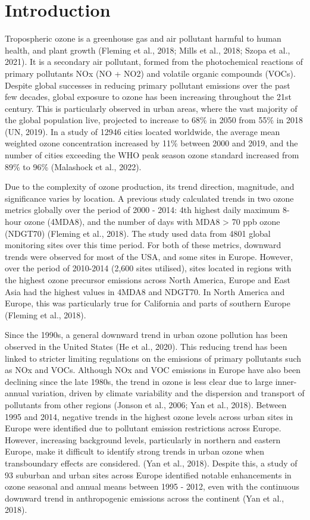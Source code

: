\documentclass[journal abbreviation, manuscript]{copernicus}
\begin{document}
\section{Introduction}  %
Tropospheric ozone is a greenhouse gas and air pollutant harmful to human health, and plant growth (Fleming et al., 2018; Mills et al., 2018; Szopa et al., 2021). It is a secondary air pollutant, formed from the photochemical reactions of primary pollutants NOx (NO + NO2) and volatile organic compounds (VOCs). Despite global successes in reducing primary pollutant emissions over the past few decades, global exposure to ozone has been increasing throughout the 21st century. This is particularly observed in urban areas, where the vast majority of the global population live, projected to increase to 68\% in 2050 from 55\% in 2018 (UN, 2019). In a study of 12946 cities located worldwide, the average mean weighted ozone concentration increased by 11\% between 2000 and 2019, and the number of cities exceeding the WHO peak season ozone standard increased from 89\% to 96\% (Malashock et al., 2022).

Due to the complexity of ozone production, its trend direction, magnitude, and significance varies by location. A previous study calculated trends in two ozone metrics globally over the period of 2000 - 2014: 4th highest daily maximum 8-hour ozone (4MDA8), and the number of days with MDA8 > 70 ppb ozone (NDGT70) (Fleming et al., 2018). The study used data from 4801 global monitoring sites over this time period. For both of these metrics, downward trends were observed for most of the USA, and some sites in Europe. However, over the period of 2010-2014 (2,600 sites utilised), sites located in regions with the highest ozone precursor emissions across North America, Europe and East Asia had the highest values in 4MDA8 and NDGT70. In North America and Europe, this was particularly true for California and parts of southern Europe (Fleming et al., 2018).

Since the 1990s, a general downward trend in urban ozone pollution has been observed in the United States (He et al., 2020). This reducing trend has been linked to stricter limiting regulations on the emissions of primary pollutants such as NOx and VOCs. Although NOx and VOC emissions in Europe have also been declining since the late 1980s, the trend in ozone is less clear due to large inner-annual variation, driven by climate variability and the dispersion and transport of pollutants from other regions (Jonson et al., 2006; Yan et al., 2018). Between 1995 and 2014, negative trends in the highest ozone levels across urban sites in Europe were identified due to pollutant emission restrictions across Europe. However, increasing background levels, particularly in northern and eastern Europe, make it difficult to identify strong trends in urban ozone when transboundary effects are considered. (Yan et al., 2018). Despite this, a study of 93 suburban and urban sites across Europe identified notable enhancements in ozone seasonal and annual means between 1995 - 2012, even with the continuous downward trend in anthropogenic emissions across the continent (Yan et al., 2018).
\end{document}
